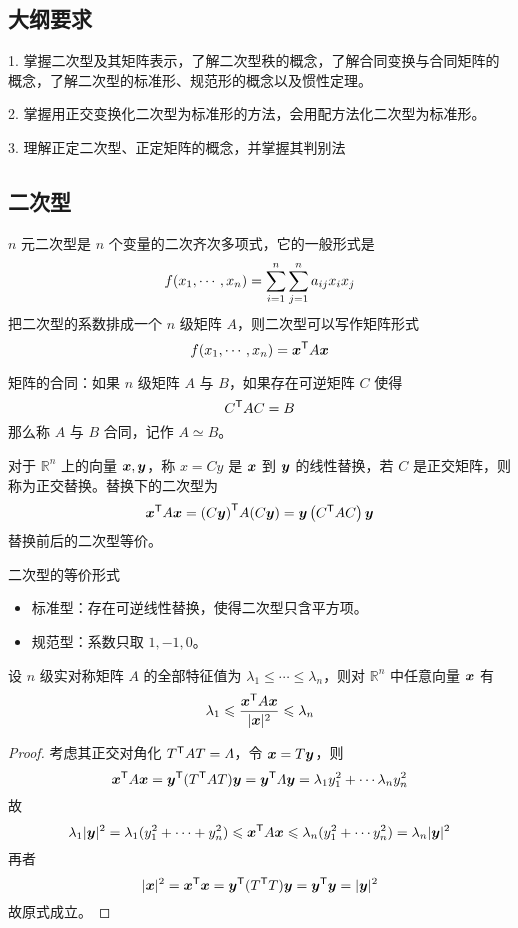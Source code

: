 \subsection{大纲要求}

1. 掌握二次型及其矩阵表示，了解二次型秩的概念，了解合同变换与合同矩阵的概念，了解二次型的标准形、规范形的概念以及惯性定理。

2. 掌握用正交变换化二次型为标准形的方法，会用配方法化二次型为标准形。

3. 理解正定二次型、正定矩阵的概念，并掌握其判别法

\subsection{二次型}

\newcommand{\xAx}{\transpose{\vbf{x}}A\vbf{x}}

\begin{definition}[二次型]
	$n$ 元二次型是 $n$ 个变量的二次齐次多项式，它的一般形式是
	\[f(x_1,\cdots,x_n) = \sum_{i=1}^n\sum_{j=1}^na_{ij}x_ix_j\]
	把二次型的系数排成一个 $n$ 级矩阵 $A$，则二次型可以写作矩阵形式
	\[f(\seq{x}{n}) = \xAx\]
\end{definition}

矩阵的合同：如果 $n$ 级矩阵 $A$ 与 $B$，如果存在可逆矩阵 $C$ 使得
\[ {C}^\mathsf{T}AC = B \]
那么称 $A$ 与 $B$ 合同，记作 $A\simeq B$。

对于 $\mathbb{R}^n$ 上的向量 $\boldsymbol{x}, \boldsymbol{y}$，称 $x = Cy$ 是 $\boldsymbol{x}$ 到 $\boldsymbol{y}$ 的线性替换，若 $C$ 是正交矩阵，则称为正交替换。替换下的二次型为
\[ \xAx = \transpose{(C\vbf{y})} A (C\vbf{y}) = \vbf{y}\left(\transpose{C} A C\right)\vbf{y} \]
替换前后的二次型等价。

二次型的等价形式
\begin{itemize}
	\item 标准型：存在可逆线性替换，使得二次型只含平方项。
	\item 规范型：系数只取 $1,-1,0$。
\end{itemize}

\begin{theorem}
	设 $n$ 级实对称矩阵 $A$ 的全部特征值为 $\lambda_1 \leqslant \cdots \leqslant \lambda_n$，则对 $\mathbb{R}^n$ 中任意向量 $\boldsymbol{x}$ 有
	\[ \lambda_1 \leqslant \frac{\xAx}{|\vbf{x}|^2} \leqslant \lambda_n \]
\end{theorem}

\begin{proof}
	考虑其正交对角化 ${T}^\mathsf{T}AT = \varLambda$，令 $\boldsymbol{x} = T\boldsymbol{y}$，则
	\[ \xAx = \transpose{\vbf{y}} (\transpose{T}AT) \vbf{y}= \transpose{\vbf{y}} \varLambda \vbf{y} = \lambda_1 y_1^2 + \cdots \lambda_n y_n^2 \]
	故
	\[ \lambda_1 |\vbf{y}|^2 = \lambda_1(y_1^2 + \cdots + y_n^2) \leqslant \xAx \leqslant \lambda_n(y_1^2 + \cdots y_n^2) = \lambda_n |\vbf{y}|^2 \]
	再者
	\[ |\boldsymbol{x}|^2 = {\boldsymbol{x}}^\mathsf{T}\boldsymbol{x} = {\boldsymbol{y}}^\mathsf{T}({T}^\mathsf{T}T)\boldsymbol{y} = {\boldsymbol{y}}^\mathsf{T}\boldsymbol{y} = |\boldsymbol{y}|^2 \]
	故原式成立。
\end{proof}

